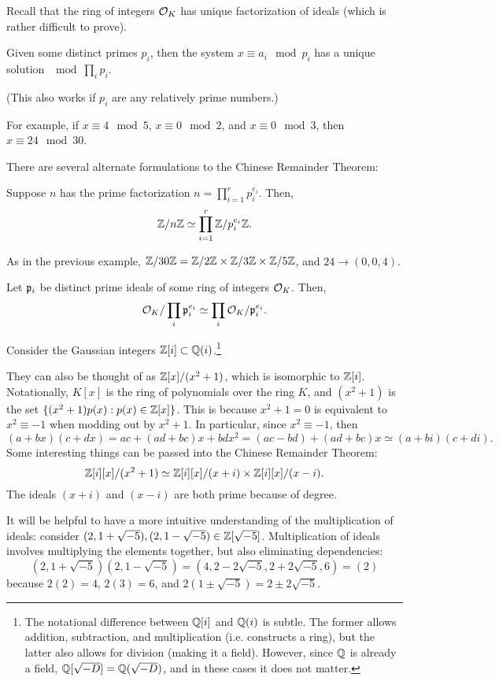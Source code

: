 Recall that the ring of integers $\mathcal{O}_K$ has unique factorization of ideals (which is rather difficult to prove).
\begin{thm}
\label{crt}
Given some distinct primes $p_i$, then the system $x \equiv a_i\mod p_i$ has a unique solution $\mod \prod_i p_i$.
\end{thm}
(This also works if $p_i$ are any relatively prime numbers.)

For example, if $x\equiv 4\mod 5$, $x\equiv 0\mod 2$, and $x \equiv 0\mod 3$, then $x\equiv 24\mod 30$.

There are several alternate formulations to the Chinese Remainder Theorem:
\begin{thm}
Suppose $n$ has the prime factorization $n = \prod_{i=1}^r p_i^{e_i}$. Then,
\[\mathbb{Z}/n\mathbb{Z} \simeq \prod_{i=1}^r \mathbb{Z}/p_i^{e_i}\mathbb{Z}.\]
\end{thm}
As in the previous example, $\mathbb{Z}/30\mathbb{Z} = \mathbb{Z}/2\mathbb{Z}\times\mathbb{Z}/3\mathbb{Z}\times \mathbb{Z}/5\mathbb{Z}$, and $24\to (0,0,4)$.
\begin{thm}
\label{crtideals}
Let $\mathfrak p_i$ be distinct prime ideals of some ring of integers $\mathcal{O}_K$. Then,
\[\mathcal{O}_K / \prod_i \mathfrak p_i^{e_i} \simeq \prod_i \mathcal{O}_K/\mathfrak p_i^{e_i}.\]
\end{thm}
Consider the Gaussian integers $\mathbb{Z}[i]\subset\mathbb{Q}(i)$.\footnote{The notational difference between $\mathbb{Q}[i]$ and $\mathbb{Q}(i)$ is subtle. The former allows addition, subtraction, and multiplication (i.e. constructs a ring), but the latter also allows for division (making it a field). However, since $\mathbb{Q}$ is already a field, $\mathbb{Q}[\sqrt{-D}] = \mathbb{Q}(\sqrt{-D})$, and in these cases it does not matter.}

They can also be thought of as $\mathbb{Z}[x]/(x^2+1)$, which is isomorphic to $\mathbb{Z}[i]$. Notationally, $K[x]$ is the ring of polynomials over the ring $K$, and $(x^2+1)$ is the set $\{(x^2+1)p(x):p(x)\in\mathbb{Z}[x]\}$. This is because $x^2+1 = 0$ is equivalent to $x^2\equiv -1$ when modding out by $x^2+1$. In particular, since $x^2\equiv -1$, then
\[(a+bx)(c+dx) = ac+(ad+bc)x+bdx^2 = (ac-bd) + (ad+bc)x \simeq (a+bi)(c+di).\]
Some interesting things can be passed into the Chinese Remainder Theorem:
\[\mathbb{Z}[i][x]/(x^2+1) \simeq \mathbb{Z}[i][x]/(x+i) \times \mathbb{Z}[i][x]/(x-i).\]
The ideals $(x+i)$ and $(x-i)$ are both prime because of degree.

It will be helpful to have a more intuitive understanding of the multiplication of ideals: consider $(2,1+\sqrt{-5}),(2,1-\sqrt{-5})\in\mathbb{Z}[\sqrt{-5}]$. Multiplication of ideals involves multiplying the elements together, but also eliminating dependencies:
\[(2,1+\sqrt{-5})(2,1-\sqrt{-5}) = (4,2-2\sqrt{-5},2+2\sqrt{-5},6) = (2)\] because $2(2) = 4$, $2(3) = 6$, and $2(1\pm \sqrt{-5}) = 2\pm 2\sqrt{-5}$.

